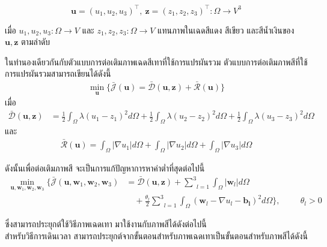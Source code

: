 \documentclass[hidelinks, a4paper,12pt]{article}
\numberwithin{equation}{section}							%
\numberwithin{equation}{section}
\begin{document}
{$$ \boldsymbol{u} = (u_1,u_2,u_3)^{\top},\ \boldsymbol{z} = (z_1,z_2,z_3)^{\top} : \Omega  \rightarrow V^3 $$

\noindent เมื่อ $u_1,u_2,u_3: \Omega  \rightarrow V$ และ $z_1,z_2,z_3: \Omega  \rightarrow V$ แทนภาพในเฉดสีแดง สีเขียว และสีน้ำเงินของ $\boldsymbol{u},\boldsymbol{z}$ ตามลำดับ 

\hspace{1cm} ในทำนองเดียวกันกับตัวแบบการต่อเติมภาพเฉดสีเทาที่ใช้การแปรผันรวม ตัวแบบการต่อเติมภาพสีที่ใช้การแปรผันรวมสามารถเขียนได้ดังนี้
\begin{align}
\min_{\boldsymbol{u}} \{ \bar{\mathcal{J}}(\boldsymbol{u})= \mathcal{\bar{D}}(\boldsymbol{u},\boldsymbol{z})+  \mathcal{\bar{R}}(\boldsymbol{u}) \}
\label{e10}
\end{align}
\clearpage
เมื่อ
\begin{align*}
\mathcal{\bar{D}}(\boldsymbol{u},\boldsymbol{z}) 
&= \frac{1}{2}\int_{\Omega}^{}\lambda(u_1 - z_1)^2 d\Omega + \frac{1}{2}\int_{\Omega}^{}\lambda(u_2 - z_2)^2 d\Omega + \frac{1}{2}\int_{\Omega}^{}\lambda(u_3 - z_3)^2 d\Omega
\end{align*}
และ 
\begin{align*}
\mathcal{\bar{R}}(\boldsymbol{u})= \int_{\Omega}^{}\lvert\nabla u_1 \rvert d\Omega + \int_{\Omega}^{}\lvert\nabla u_2 \rvert d\Omega + \int_{\Omega}^{}\lvert\nabla u_3 \rvert d\Omega
\end{align*}

\hspace{1cm}  ดังนั้นเพื่อต่อเติมภาพสี จะเป็นการแก้ปัญหาการหาค่าต่ำที่สุดต่อไปนี้ 
\begin{align}
\min_{\boldsymbol{u},\boldsymbol{w}_1,\boldsymbol{w}_2,\boldsymbol{w}_3} \{\bar{\mathcal{J}}(\boldsymbol{u},\boldsymbol{w}_1,\boldsymbol{w}_2,\boldsymbol{w}_3)&= \mathcal{\bar{D}}(\boldsymbol{u},\boldsymbol{z}) +  \underset{l=1}{\overset{3}{\sum}} \int_{\Omega}^{}|\boldsymbol{w}_l|d\Omega
\nonumber\\
&\quad+ \frac{\theta_l}{2} \underset{l=1}{\overset{3}{\sum}}\int_{\Omega}^{}(\boldsymbol{w}_l - \nabla u_l - \boldsymbol{b_l})^{2}d\Omega\}, \hspace{1cm} \theta_l > 0
\end{align}

\vspace{1cm}
ซึ่งสามารถประยุกต์ใช้วิธีภาพเฉดเทา มาใช้งานกับภาพสีได้ดังต่อไปนี้ \\
สำหรับวิธีการเดินเวลา สามารถประยุกต์จากขั้นตอนสำหรับภาพเฉดเทาเป็นขั้นตอนสำหรับภาพสีได้ดังนี้

}
\end{document}
